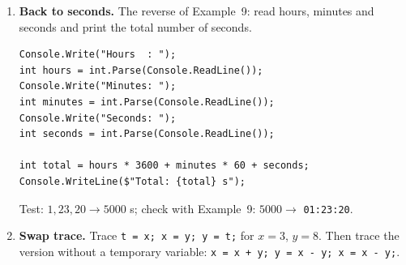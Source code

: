 \begin{enumerate}[label=\textbf{E\arabic*.},leftmargin=*,itemsep=1pt]
\begin{solbox}
\begin{lstlisting}[numbers=none]
double average = (g1 + g2 + g3) / 3;   // parentheses!
Console.WriteLine($"Average: {average:F2}");
\end{lstlisting}
 Test: $60, 70, 85 \to 71.67$. Without the parentheses the program would print $60+70+28.33 = 158.33$.
\end{solbox}\fi
  \item {} \textbf{Back to seconds.} The reverse of Example~9: read hours, minutes and seconds and print the total number of seconds.
  \ifsolutions\begin{solbox}\begin{lstlisting}[numbers=none]
Console.Write("Hours  : ");
int hours = int.Parse(Console.ReadLine());
Console.Write("Minutes: ");
int minutes = int.Parse(Console.ReadLine());
Console.Write("Seconds: ");
int seconds = int.Parse(Console.ReadLine());

int total = hours * 3600 + minutes * 60 + seconds;
Console.WriteLine($"Total: {total} s");
\end{lstlisting}
 Test: $1, 23, 20 \to 5000$ s; check with Example~9: $5000 \to$ \texttt{01:23:20}.
\end{solbox}\fi
  \item {} \textbf{Swap trace.} Trace \texttt{t = x; x = y; y = t;} for $x=3$, $y=8$. Then trace the version without a temporary variable: \texttt{x = x + y; y = x - y; x = x - y;}.
\end{enumerate}

